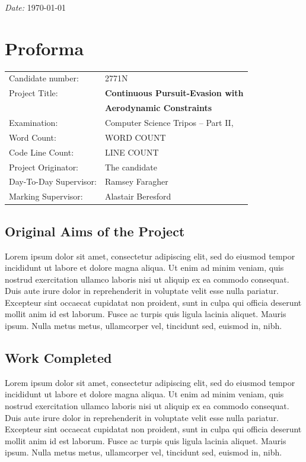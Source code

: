 \documentclass[12pt,a4paper,twoside,openright]{report}
\begin{document}
\emph{Date:} \today

\chapter*{Proforma}
 {\large
  \begin{tabular}{ll}
	  Candidate number:   & 2771N \\
	  Project Title:      & \bf Continuous Pursuit-Evasion with \\ & \bf Aerodynamic Constraints \\
	  Examination:        & Computer Science Tripos -- Part II, \the\year \\
	  Word Count:         & WORD COUNT\footnotemark[1] \\
	  Code Line Count:    & LINE COUNT\footnotemark[2] \\
	  Project Originator: & The candidate \\
	  Day-To-Day Supervisor: & Ramsey Faragher \\
	  Marking Supervisor: & Alastair Beresford \\
  \end{tabular}
 }

\section*{Original Aims of the Project}

Lorem ipsum dolor sit amet, consectetur adipiscing elit, sed do eiusmod tempor incididunt ut labore et dolore magna aliqua. Ut enim ad minim veniam, quis nostrud exercitation ullamco laboris nisi ut aliquip ex ea commodo consequat. Duis aute irure dolor in reprehenderit in voluptate velit esse nulla pariatur. Excepteur sint occaecat cupidatat non proident, sunt in culpa qui officia deserunt mollit anim id est laborum.
Fusce ac turpis quis ligula lacinia aliquet. Mauris ipsum. Nulla metus metus, ullamcorper vel, tincidunt sed, euismod in, nibh.

\section*{Work Completed}

Lorem ipsum dolor sit amet, consectetur adipiscing elit, sed do eiusmod tempor incididunt ut labore et dolore magna aliqua. Ut enim ad minim veniam, quis nostrud exercitation ullamco laboris nisi ut aliquip ex ea commodo consequat. Duis aute irure dolor in reprehenderit in voluptate velit esse nulla pariatur. Excepteur sint occaecat cupidatat non proident, sunt in culpa qui officia deserunt mollit anim id est laborum.
Fusce ac turpis quis ligula lacinia aliquet. Mauris ipsum. Nulla metus metus, ullamcorper vel, tincidunt sed, euismod in, nibh.
\end{document}
